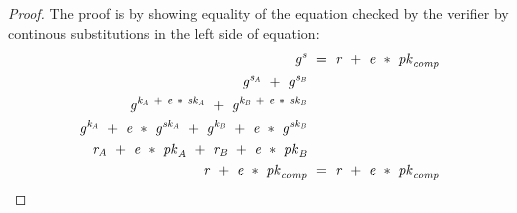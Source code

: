\begin{proof}
    \label{prf:twopartySchnorr}
    The proof is by showing equality of the equation checked by the verifier by continous substitutions in the left side of equation:
    \begin{align}
        \mathit{g}^{\mathit{s}} &~=~ \mathit{r} ~+~ \mathit{e} ~*~ \mathit{pk}_{\mathit{comp}} \\
        \mathit{g}^{\mathit{s}_{\mathit{A}}} ~+~ \mathit{g}^{\mathit{s}_{\mathit{B}}} & \\
        \mathit{g}^{\mathit{\mathit{k}_{\mathit{A}}} ~+~ \mathit{e} ~*~ \mathit{sk}_{\mathit{A}}} ~+~ \mathit{g}^{\mathit{\mathit{k}_{\mathit{B}}} ~+~ \mathit{e} ~*~ \mathit{sk}_{\mathit{B}}} & \\
        \mathit{g}^{\mathit{\mathit{k}_{\mathit{A}}}} ~+~ \mathit{e} ~*~ \mathit{g}^{\mathit{sk}_{\mathit{A}}} ~+~ \mathit{g}^{\mathit{\mathit{k}_{\mathit{B}}}} ~+~ \mathit{e} ~*~ \mathit{g}^{\mathit{sk}_{\mathit{B}}} & \\
        \mathit{r}_{\mathit{A}} ~+~ \mathit{e} ~*~ \mathit{pk}_{\mathit{A}} ~+~ \mathit{r}_{\mathit{B}} ~+~ \mathit{e} ~*~ \mathit{pk}_{\mathit{B}} & \\
        \mathit{r} ~+~ \mathit{e} ~*~ \mathit{pk}_{\mathit{comp}} & ~=~ \mathit{r} ~+~ \mathit{e} ~*~ \mathit{pk}_{\mathit{comp}}
    \end{align}
\end{proof}

